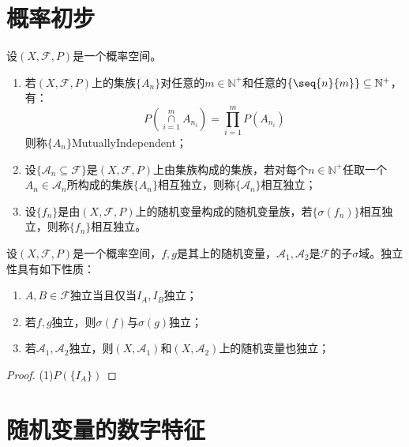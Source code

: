\chapter{概率初步}

\begin{definition}
	设$(X,\mathscr{F},P)$是一个概率空间。
	\begin{enumerate}
		\item 若$(X,\mathscr{F},P)$上的集族$\{A_n\}$对任意的$m\in\mathbb{N}^+$和任意的$\{\seq{n}{m}\}\subseteq\mathbb{N}^+$，有：
		\begin{equation*}
			P\left(\underset{i=1}{\overset{m}{\cap}}A_{n_i}\right)=\prod_{i=1}^{m}P(A_{n_i})
		\end{equation*}
		则称$\{A_n\}$\gls{MutuallyIndependent}；
		\item 设$\{\mathscr{A}_n\subseteq\mathscr{F}\}$是$(X,\mathscr{F},P)$上由集族构成的集族，若对每个$n\in\mathbb{N}^+$任取一个$A_n\in\mathscr{A}_n$所构成的集族$\{A_n\}$相互独立，则称$\{\mathscr{A}_n\}$相互独立；
		\item 设$\{f_n\}$是由$(X,\mathscr{F},P)$上的随机变量构成的随机变量族，若$\{\sigma(f_n)\}$相互独立，则称$\{f_n\}$相互独立。
	\end{enumerate}
\end{definition}
\begin{property}\label{prop:Independent}
	设$(X,\mathscr{F},P)$是一个概率空间，$f,g$是其上的随机变量，$\mathscr{A}_1,\mathscr{A}_2$是$\mathscr{F}$的子$\sigma$域。独立性具有如下性质：
	\begin{enumerate}
		\item $A,B\in\mathscr{F}$独立当且仅当$I_A,I_B$独立；
		\item 若$f,g$独立，则$\sigma(f)$与$\sigma(g)$独立；
		\item 若$\mathscr{A}_1,\mathscr{A}_2$独立，则$(X,\mathscr{A}_1)$和$(X,\mathscr{A}_2)$上的随机变量也独立；
	\end{enumerate}
\end{property}
\begin{proof}
	(1)$P(\{I_A\})$
\end{proof}

\chapter{随机变量的数字特征}










